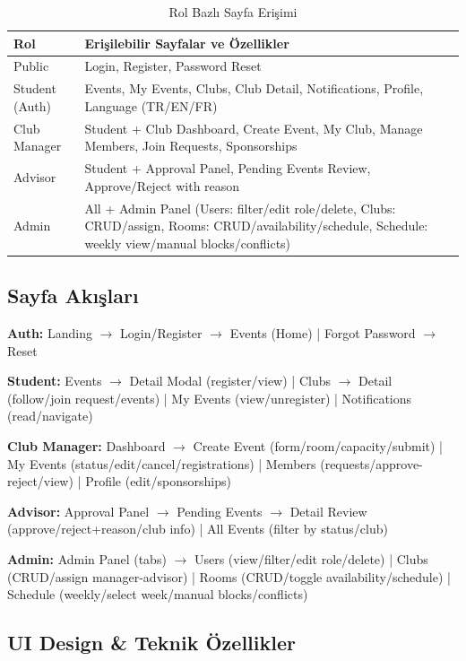 \documentclass[a4paper,12pt]{report}
\begin{document}
\begin{table}[h]
\centering
\scriptsize
\begin{tabular}{|l|p{11cm}|}
\hline
\textbf{Rol} & \textbf{Erişilebilir Sayfalar ve Özellikler} \\ \hline
Public & Login, Register, Password Reset \\ \hline
Student (Auth) & Events, My Events, Clubs, Club Detail, Notifications, Profile, Language (TR/EN/FR) \\ \hline
Club Manager & Student + Club Dashboard, Create Event, My Club, Manage Members, Join Requests, Sponsorships \\ \hline
Advisor & Student + Approval Panel, Pending Events Review, Approve/Reject with reason \\ \hline
Admin & All + Admin Panel (Users: filter/edit role/delete, Clubs: CRUD/assign, Rooms: CRUD/availability/schedule, Schedule: weekly view/manual blocks/conflicts) \\ \hline
\end{tabular}
\caption{Rol Bazlı Sayfa Erişimi}
\end{table}

\subsection{Sayfa Akışları}

\textbf{Auth:} Landing $\rightarrow$ Login/Register $\rightarrow$ Events (Home) | Forgot Password $\rightarrow$ Reset

\textbf{Student:} Events $\rightarrow$ Detail Modal (register/view) | Clubs $\rightarrow$ Detail (follow/join request/events) | My Events (view/unregister) | Notifications (read/navigate)

\textbf{Club Manager:} Dashboard $\rightarrow$ Create Event (form/room/capacity/submit) | My Events (status/edit/cancel/registrations) | Members (requests/approve-reject/view) | Profile (edit/sponsorships)

\textbf{Advisor:} Approval Panel $\rightarrow$ Pending Events $\rightarrow$ Detail Review (approve/reject+reason/club info) | All Events (filter by status/club)

\textbf{Admin:} Admin Panel (tabs) $\rightarrow$ Users (view/filter/edit role/delete) | Clubs (CRUD/assign manager-advisor) | Rooms (CRUD/toggle availability/schedule) | Schedule (weekly/select week/manual blocks/conflicts)

\subsection{UI Design \& Teknik Özellikler}
\end{document}
